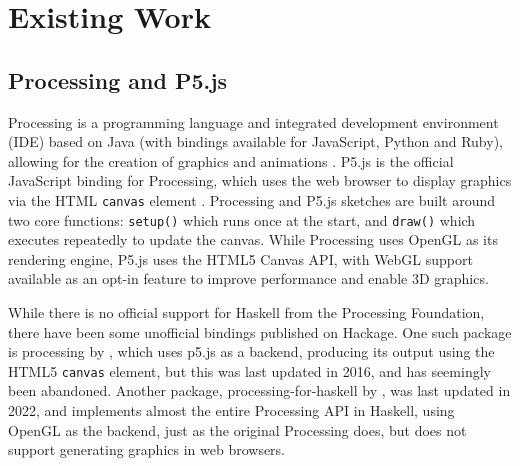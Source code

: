 \documentclass[../main.tex]{subfiles}
\begin{document}
    \section{Existing Work}
        \subsection{Processing and P5.js}
            Processing is a programming language and integrated development environment
                (IDE) based on Java (with bindings available for JavaScript, Python and Ruby),
                allowing for the creation of graphics and animations \citep{processing}.
            P5.js is the official JavaScript binding for Processing, which uses the web
                browser to display graphics via the HTML \texttt{canvas} element \citep{p5js}.
            Processing and P5.js sketches are built around two core functions:
                \texttt{setup()} which runs once at the start, and \texttt{draw()} which
                executes repeatedly to update the canvas.
            While Processing uses OpenGL as its rendering engine, P5.js uses the HTML5
                Canvas API, with WebGL support available as an opt-in feature \citep{p5WebGL}
                to improve performance and enable 3D graphics.

            While there is no official support for Haskell from the Processing Foundation,
                there have been some unofficial bindings published on Hackage.
            One such package is processing by \citet{hackageProcessing}, which uses p5.js
                as a backend, producing its output using the HTML5 \texttt{canvas} element, but
                this was last updated in 2016, and has seemingly been abandoned.
            Another package, processing-for-haskell by \citet{hackageProcessingForHaskell},
                was last updated in 2022, and implements almost the entire Processing API in
                Haskell, using OpenGL as the backend, just as the original Processing does, but
                does not support generating graphics in web browsers.
\end{document}
